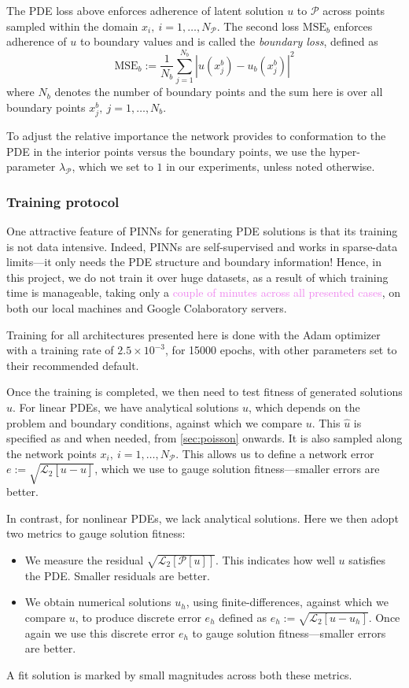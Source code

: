 \documentclass[11pt]{article}
\newcommand{\abs}[1]{\left\lvert#1\right\rvert}
\newcommand{\mse}{\textrm{MSE}}
\newcommand{\pde}{\ensuremath{\mathcal{P}}}
\newcommand{\Ltwo}[1]{\ensuremath{\mathcal{L}_2\left[#1\right]}}
\newcommand{\newcontent}[1]{\textcolor{violet}{#1}}
\begin{document}
The PDE loss above enforces adherence of latent solution \(u\) to \(\pde\) across
points sampled within the domain \(x_i,~i = 1, \dots,  N_\pde\). The second
loss \(\mse_{b}\) enforces adherence of \(u\) to boundary values and is called the
\emph{boundary loss}, defined as
\[ \mse_{b} :=  \frac{1}{N_b}\sum_{j=1}^{N_b} \abs{u(x^b_j) - u_b(x^b_j) }^2\]
where \(N_b\) denotes the number of boundary points and the sum here is
over all boundary points \(x^b_j,~j = 1, \dots,  N_b\).

To adjust the relative importance the network provides to conformation to
the PDE in the interior points versus the boundary points, we use the
hyper-parameter \(\lambda_{\pde}\), which we set to \(1\) in our
experiments, unless noted otherwise.

\subsubsection{Training protocol}
\label{sec:org7b1a560}
One attractive feature of PINNs for generating PDE solutions is that its training
is not data intensive. Indeed, PINNs are self-supervised and works in
sparse-data limits---it only needs the PDE structure and boundary
information! Hence, in this project, we do not train it over huge datasets,
as a result of which training time is manageable, taking only a
\newcontent{couple of minutes across all presented cases},
on both our local machines and Google Colaboratory servers.

Training for all architectures presented here is done with the Adam
optimizer \cite{kingma2014adam} with a training rate of \(2.5 \times
	10^{-3}\), for 15000 epochs,
with other parameters set to their recommended default.

Once the training is completed, we then need to test fitness of generated
solutions \(u\). For linear PDEs, we have analytical solutions \(\hat{u}\), which depends on the problem and boundary conditions, against
which we compare \(u\). This \(\hat{u}\) is specified as and when needed,
from \cref{sec:poisson} onwards. It is also sampled along the network points \(x_i,~i = 1, \dots,  N_\pde\). This allows us to define a network error \(e := \sqrt{\Ltwo{u - \hat{u}}}\), which we use to gauge solution
fitness---smaller errors are better.

In contrast, for nonlinear PDEs, we lack analytical solutions. Here we then
adopt two metrics to gauge solution fitness:
\begin{itemize}
\item We measure the residual \(\sqrt{\Ltwo{\pde[u]}}\). This indicates how well
\(u\) satisfies the PDE. Smaller residuals are better.
\item We obtain numerical solutions \(u_{h}\), using finite-differences,
against which we compare \(u\), to produce discrete error \(e_h\)
defined as \(e_h := \sqrt{\Ltwo{u - u_{h}}}\). Once again we use this discrete
error \(e_h\) to gauge solution fitness---smaller errors are better.
\end{itemize}
A fit solution is marked by small magnitudes across both these metrics.
\end{document}
